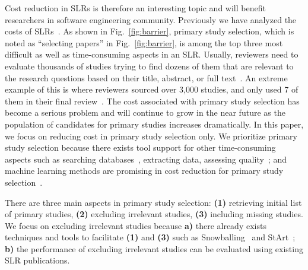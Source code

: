 \documentclass{svjour3}
\theoremstyle{break}
\begin{document}
Cost reduction in SLRs is therefore an interesting topic and will benefit researchers in software engineering community.
Previously we have analyzed the costs of SLRs~\cite{hassler2014outcomes,carver2013identifying}. As shown in Fig.~\ref{fig:barrier}, primary study selection, which is noted as ``selecting papers'' in Fig.~\ref{fig:barrier}, is among the top three most difficult
as well as time-consuming aspects in an SLR. Usually, reviewers need to evaluate
thousands of studies trying to find dozens of them that are relevant to the
research questions based on their title, abstract, or full text~\cite{bowes2012slurp}. An extreme
example of this is where reviewers sourced over
3,000 studies, and only used 7 of them in their final review~\cite{bezerra2009systematic}. The cost associated with primary study selection has become a serious problem and will continue to grow in the near future as the population of candidates for primary
studies increases dramatically. In this paper, we focus on reducing cost in primary study selection only. We prioritize primary study selection because there exists tool support for other time-consuming aspects such as searching databases~\cite{Molleri:2015:SWA:2745802.2745825,hernandes2012using}, extracting data\cite{Molleri:2015:SWA:2745802.2745825,hernandes2012using,fernandez2010slr,bowes2012slurp}, assessing quality~\cite{fernandez2010slr,bowes2012slurp,Molleri:2015:SWA:2745802.2745825}; and machine learning methods are promising in cost reduction for primary study selection~\cite{wallace2010semi,grossman2013}.



There are three main aspects in primary study selection: \textbf{(1)} retrieving initial list of primary studies, \textbf{(2)} excluding irrelevant studies, \textbf{(3)} including missing studies. We focus on excluding irrelevant studies because \textbf{a)} there already exists techniques and tools to facilitate \textbf{(1)} and \textbf{(3)} such as Snowballing~\cite{jalali2012systematic} and StArt~\cite{hernandes2012using}; \textbf{b)} the performance of excluding irrelevant studies can be evaluated using existing SLR publications.
\end{document}

